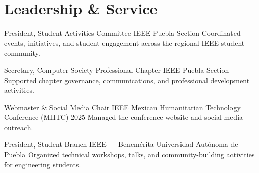 \documentclass[11pt,a4paper,sans]{moderncv}
\begin{document}

\section{Leadership \& Service}

  {President, Student Activities Committee}
  {IEEE Puebla Section}{}{}
  {Coordinated events, initiatives, and student engagement across the regional IEEE student community.}

  {Secretary, Computer Society Professional Chapter}
  {IEEE Puebla Section}{}{}
  {Supported chapter governance, communications, and professional development activities.}

  {Webmaster \& Social Media Chair}
  {IEEE Mexican Humanitarian Technology Conference (MHTC) 2025}{}{}
  {Managed the conference website and social media outreach.}

  {President, Student Branch}
  {IEEE --- Benem\'erita Universidad Aut\'onoma de Puebla}{}{}
  {Organized technical workshops, talks, and community-building activities for engineering students.}
\end{document}
